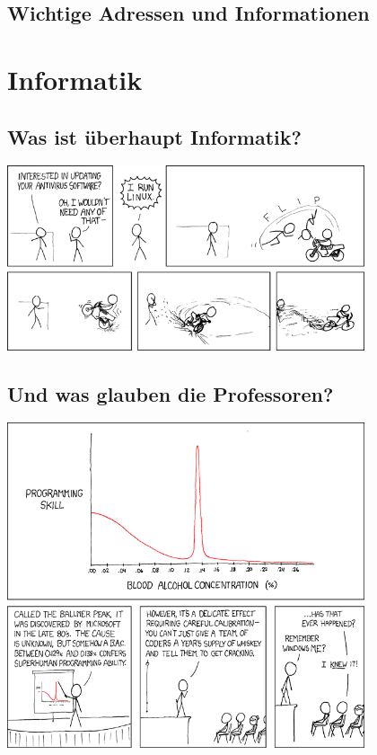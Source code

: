 \documentclass[12pt,a4paper]{scrartcl}
\begin{document}
    \subsection{Wichtige Adressen und Informationen}
    
\newpage
\section{Informatik}
    \subsection{Was ist \"uberhaupt Informatik?}
    
    \begin{center}
        \includegraphics[width=0.79\textwidth]{comics/linux_user_at_best_buy.png}
    \end{center}
    \clearpage
    \subsection{Und was glauben die Professoren?}
    
    \begin{center}
        \vspace{2.5cm}
        \includegraphics[width=0.79\textwidth]{comics/ballmer_peak.png}
    \end{center}
    \newpage
\end{document}
